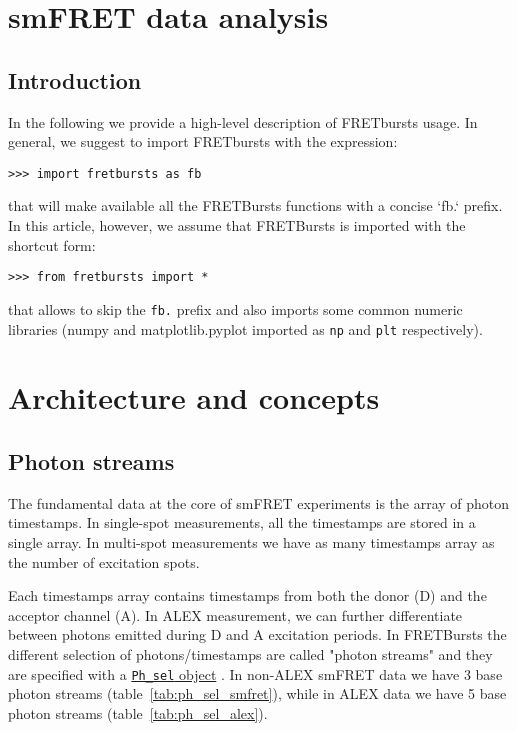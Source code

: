 \section{smFRET data analysis}

\subsection{Introduction}

In the following we provide a high-level description of FRETbursts usage. In general, we suggest to import FRETbursts with the expression:

\begin{verbatim}
>>> import fretbursts as fb
\end{verbatim}

that will make available all the FRETBursts functions with a concise `fb.` prefix. In this article, however, we assume that FRETBursts is imported with the shortcut form:

\begin{verbatim}
>>> from fretbursts import *
\end{verbatim}

that allows to skip the \verb|fb.| prefix and also imports some common numeric libraries (numpy and matplotlib.pyplot imported as \verb|np| and \verb|plt| respectively).

\section{Architecture and concepts}
\subsection{Photon streams}
\label{sec:ph_streams}

The fundamental data at the core of smFRET experiments is the array of photon timestamps. In single-spot measurements, all the timestamps are stored in a single array. In multi-spot measurements we have as many timestamps array as the number of excitation spots.

Each timestamps array contains timestamps from both the donor (D) and the acceptor channel (A). In ALEX measurement, we can further differentiate between photons emitted during D and A excitation periods. In FRETBursts the different selection of photons/timestamps are called "photon streams" and they are specified with a \href{http://fretbursts.readthedocs.org/en/latest/data_class.html#module-fretbursts.ph_sel}{\texttt{Ph\_sel} object} . In non-ALEX smFRET data we have 3 base photon streams (table~\ref{tab:ph_sel_smfret}), while in ALEX data we have 5 base photon streams 
(table~\ref{tab:ph_sel_alex}).

